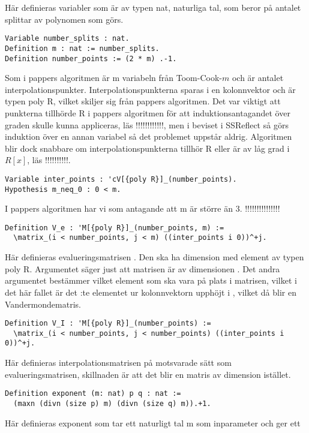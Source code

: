 Här definieras variabler som är av typen nat, naturliga tal, som beror på
antalet splittar av polynomen som görs.
\begin{lstlisting}
Variable number_splits : nat.
Definition m : nat := number_splits.
Definition number_points := (2 * m) .-1.
\end{lstlisting}
Som i pappers algoritmen är m variabeln från Toom-Cook-$m$ och
 är antalet interpolationspunkter.
Interpolationspunkterna sparas i en kolonnvektor och är typen poly R, vilket
skiljer sig från pappers algoritmen. Det var viktigt att punkterna tillhörde R
i pappers algoritmen för att induktionsantagandet över graden skulle kunna
appliceras, läs !!!!!!!!!!!!, men i beviset i SSReflect så görs induktion över
en annan variabel så det problemet uppstår aldrig. Algoritmen blir dock
snabbare om interpolationspunkterna tillhör R eller är av låg grad i $R[x]$,
läs !!!!!!!!!!.
\begin{lstlisting}
Variable inter_points : 'cV[{poly R}]_(number_points).
Hypothesis m_neq_0 : 0 < m.
\end{lstlisting}
I pappers algoritmen har vi som antagande att m är större än 3. !!!!!!!!!!!!!!!
\begin{lstlisting}
Definition V_e : 'M[{poly R}]_(number_points, m) :=
  \matrix_(i < number_points, j < m) ((inter_points i 0))^+j.
\end{lstlisting}
Här definieras evalueringsmatrisen . Den ska ha dimension
 med element av typen poly R. Argumentet  säger just att matrisen är av dimensionen
. Det andra argumentet 
bestämmer vilket element som ska vara på plats  i matrisen, vilket i
det här fallet är det :te elementet ur kolonnvektorn 
upphöjt i , vilket då blir en Vandermondematris.
\begin{lstlisting}
Definition V_I : 'M[{poly R}]_(number_points) :=
  \matrix_(i < number_points, j < number_points) ((inter_points i 0))^+j.
\end{lstlisting}
Här definieras interpolationsmatrisen på motsvarade sätt som
evalueringsmatrisen, skillnaden är att det blir en matris av dimension
 istället.
\begin{lstlisting}
Definition exponent (m: nat) p q : nat :=
  (maxn (divn (size p) m) (divn (size q) m)).+1.
\end{lstlisting}
Här definieras exponent som tar ett naturligt tal m som inparameter och ger ett
